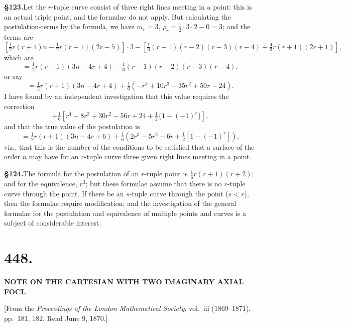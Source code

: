 \documentclass[11pt,a4paper]{article}
\begin{document}
\textbf{\S 123.}\quad Let the $r$-tuple curve consist of three right lines meeting in a point: this is an actual triple point, and the formulae do not apply. But calculating the postulation-terms by the formula, we have $m_r = 3$, $\rho_r = \frac{1}{2} \cdot 3 \cdot 2 - 0 = 3$; and the terms are
\[
[\tfrac{1}{2}r(r + 1)n - \tfrac{1}{2}r(r + 1)(2r - 5)] \cdot 3 - [\tfrac{1}{6}(r - 1)(r - 2)(r - 3)(r - 4) + \tfrac{4}{3}r(r + 1)(2r + 1)],
\]
which are
\[
= \tfrac{1}{2}r(r + 1)(3n - 4r + 4) - \tfrac{1}{6}(r - 1)(r - 2)(r - 3)(r - 4),
\]
or say
\[
= \tfrac{1}{2}r(r + 1)(3n - 4r + 4) + \tfrac{1}{6}(-r^4 + 10r^3 - 35r^2 + 50r - 24).
\]
I have found by an independent investigation that this value requires the correction
\[
+ \tfrac{1}{6}[r^4 - 8r^3 + 30r^2 - 56r + 24 + \tfrac{1}{2}\{1 - (-1)^r\}],
\]
and that the true value of the postulation is
\[
= \tfrac{1}{2}r(r + 1)(3n - 4r + 6) + \tfrac{1}{6}(2r^3 - 5r^2 - 6r + \tfrac{1}{2}[1 - (-1)^r]),
\]
viz., that this is the number of the conditions to be satisfied that a surface of the order $n$ may have for an $r$-tuple curve three given right lines meeting in a point.

\textbf{\S 124.}\quad The formula for the postulation of an $r$-tuple point is $\frac{1}{6}r(r + 1)(r + 2)$; and for the equivalence, $r^3$; but these formulae assume that there is no $r$-tuple curve through the point. If there be an $s$-tuple curve through the point ($s < r$), then the formulae require modification; and the investigation of the general formulae for the postulation and equivalence of multiple points and curves is a subject of considerable interest.

\clearpage

\section*{\textbf{448.}}

\begin{center}
\textbf{NOTE ON THE CARTESIAN WITH TWO IMAGINARY AXIAL FOCI.}
\end{center}

[From the \textit{Proceedings of the London Mathematical Society}, vol.~iii (1869--1871), pp.~181, 182. Read June 9, 1870.]
\end{document}
